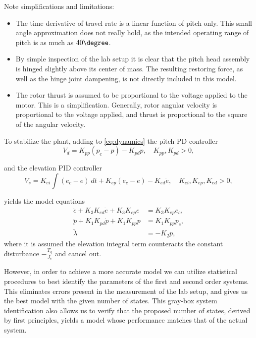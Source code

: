 Note simplifications and limitations:
\begin{itemize}
	\item{The time derivative of travel rate is a linear function of pitch only. This small angle approximation does not really hold, as the intended operating range of pitch is as much as $40\degree$.}
	\item{By simple inspection of the lab setup it is clear that the pitch head assembly is hinged slightly above its center of mass. The resulting restoring force, as well as the hinge joint dampening, is not directly included in this model.}
	\item{The rotor thrust is assumed to be proportional to the voltage applied to the motor. This is a simplification. Generally, rotor angular velocity is proportional to the voltage applied, and thrust is proportional to the square of the angular velocity.}
\end{itemize}

To stabilize the plant, adding to \eqref{eq:dynamics} the pitch PD controller
\begin{equation*}
	V_d = K_{pp} (p_c - p) - K_{pd} \dot{p}, \quad K_{pp}, K_{pd} > 0,
\end{equation*}

and the elevation PID controller
\begin{equation*}
	V_s = K_{ei} \int (e_c - e) \ dt +  K_{ep} (e_c - e) - K_{ed} \dot{e}, \quad K_{ei}, K_{ep}, K_{ed} > 0,
\end{equation*}

yields the model equations
\begin{subequations}
\label{eq:model}
\begin{align}
	\ddot{e} + K_{3} K_{ed} \dot{e} + K_{3} K_{ep} e &= K_{3} K_{ep} e_{c}, \label{eq:model_se_al_elev} \\
	\ddot{p} + K_{1} K_{pd} \dot{p} + K_{1} K_{pp} p &= K_{1} K_{pp} p_{c}, \label{eq:model_se_al_pitch} \\
	\ddot{\lambda} &= -K_{2} p, \label{eq:model_se_al_r} 
\end{align}
\end{subequations}
where it is assumed the elevation integral term counteracts the constant disturbance $-\frac{T_g}{J_e}$ and cancel out.

However, in order to achieve a more accurate model we can utilize statistical procedures to best identify the parameters of the first and second order systems. This eliminates errors present in the measurement of the lab setup, and gives us the best model with the given number of states. This gray-box system identification also allows us to verify that the proposed number of states, derived by first principles, yields a model whose performance matches that of the actual system.

